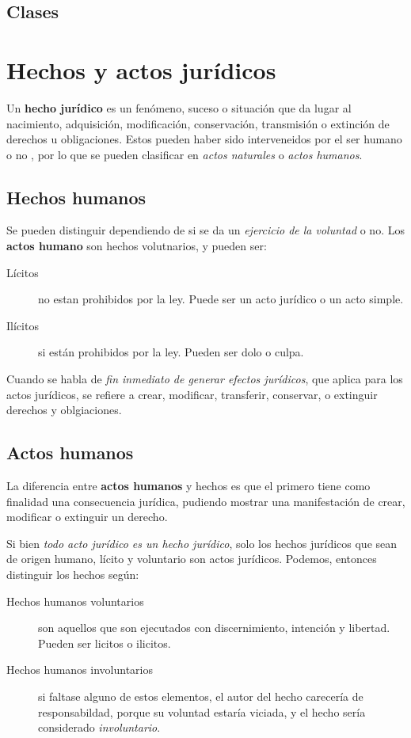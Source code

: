 \documentclass[../main.tex]{subfiles}
\begin{document}
\subsection{Clases}

\section{Hechos y actos jurídicos}

Un \textbf{hecho jurídico} es un fenómeno, suceso o situación que da lugar al
nacimiento, adquisición, modificación, conservación, transmisión o extinción de
derechos u obligaciones. Estos pueden haber sido interveneidos por el ser humano
o no , por lo que se pueden clasificar en \textit{actos naturales} o \textit{actos humanos}.

\subsection{Hechos humanos}

Se pueden distinguir dependiendo de si se da un \textit{ejercicio de la voluntad}
o no. Los \textbf{actos humano} son hechos volutnarios, y pueden ser:

\begin{description}
  \item[Lícitos] no estan prohibidos por la ley. Puede ser un acto jurídico o un
    acto simple.
  \item[Ilícitos] si están prohibidos por la ley. Pueden ser dolo o culpa.
\end{description}

Cuando se habla de \textit{fin inmediato de generar efectos jurídicos}, que aplica
para los actos jurídicos, se refiere a crear, modificar, transferir, conservar,
o extinguir derechos y oblgiaciones.

\subsection{Actos humanos}
La diferencia entre \textbf{actos humanos} y hechos es que el primero tiene como 
finalidad una consecuencia jurídica, pudiendo mostrar una manifestación de crear,
modificar o extinguir un derecho.

Si bien \textit{todo acto jurídico es un hecho jurídico}, solo los hechos jurídicos
que sean de origen humano, lícito y voluntario son actos jurídicos. Podemos, entonces
distinguir los hechos según:

\begin{description}
  \item[Hechos humanos voluntarios] son aquellos que son ejecutados con discernimiento,
    intención y libertad. Pueden ser licitos o ilicitos.
  \item[Hechos humanos involuntarios] si faltase alguno de estos elementos, el 
    autor del hecho carecería de responsabildad, porque su voluntad estaría viciada,
    y el hecho sería considerado \textit{involuntario}.
\end{description}
\end{document}
